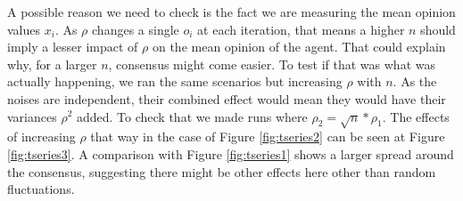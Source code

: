 \documentclass{article}
\begin{document}
{          A possible reason we need to check is the fact we are measuring the
          mean opinion values \( x_i \). As \(\rho\) changes a single \(o_i\) at
          each iteration, that means a higher \(n\) should imply a lesser impact
          of \(\rho\) on the mean opinion of the agent. That could explain why,
          for a larger $n$, consensus might come easier. To test if that was
          what was actually happening, we ran the same scenarios but increasing
          \(\rho\) with \(n\). As the noises are independent, their combined effect would mean
          they would have their variances $\rho^2$ added. To check that we made runs where  
          \(\rho_2 = \sqrt{n} * \rho_1 \). The
          effects of increasing \(\rho\) that way in the case of Figure
          \ref{fig:tseries2} can be seen at Figure \ref{fig:tseries3}. A
          comparison with Figure \ref{fig:tseries1} shows a larger spread around
          the consensus, suggesting there might be other effects here other than
          random fluctuations.


}
\end{document}
